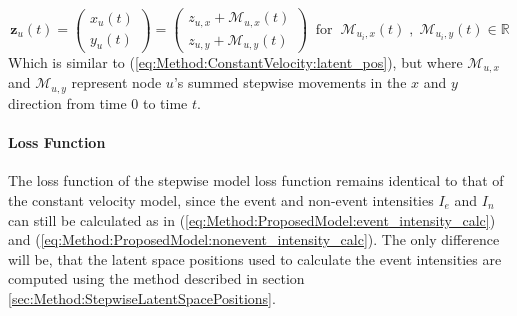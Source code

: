 \begin{equation}
    \textbf{z}_{u}(t) = 
    \begin{pmatrix}
        x_{u}(t) \\
        y_{u}(t)
    \end{pmatrix}
    =
    \begin{pmatrix}
        z_{u,x} + \mathcal{M}_{u,x}(t) \\
        z_{u,y}+ \mathcal{M}_{u,y}(t)
    \end{pmatrix}
    \;\; \text{for} \;\; \mathcal{M}_{u_i,x}(t) \;,\; \mathcal{M}_{u_i,y}(t) \in \mathbb{R}
    \label{eq:Method:ConstantVelocity:latent_pos}
\end{equation}
Which is similar to (\ref{eq:Method:ConstantVelocity:latent_pos}), but where $\mathcal{M}_{u,x}$ and $\mathcal{M}_{u,y}$ represent node $u$'s summed stepwise movements in the $x$ and $y$ direction from time 0 to time $t$.


\paragraph{Loss Function}
The loss function of the stepwise model loss function remains identical to that of the constant velocity model, since the event and non-event intensities $I_e$ and $I_n$ can still be calculated as in (\ref{eq:Method:ProposedModel:event_intensity_calc}) and (\ref{eq:Method:ProposedModel:nonevent_intensity_calc}). The only difference will be, that the latent space positions used to calculate the event intensities are computed using the method described in section \ref{sec:Method:StepwiseLatentSpacePositions}.


